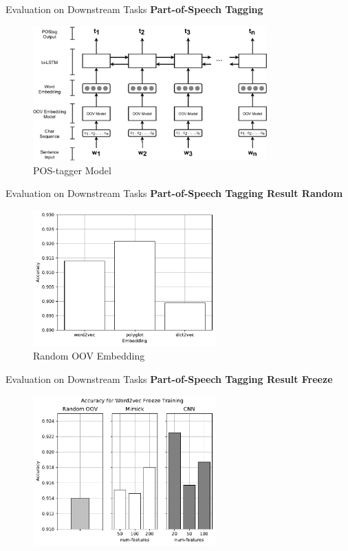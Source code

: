 \documentclass{beamer}
\begin{document}
\begin{frame}{Evaluation on Downstream Tasks}
    \textbf{Part-of-Speech Tagging}
    \begin{figure}[H]
        \centering
        \includegraphics[width=90mm]{images/postag}
        \caption{POS-tagger Model}
    \end{figure}
\end{frame}
\begin{frame}{Evaluation on Downstream Tasks}
    \textbf{Part-of-Speech Tagging Result Random}
    \begin{figure}[H]
        \centering
        \includegraphics[width=70mm]{images/random_graph}
        \caption{Random OOV Embedding}
    \end{figure}
\end{frame}
\begin{frame}{Evaluation on Downstream Tasks}
    \textbf{Part-of-Speech Tagging Result Freeze}
    \begin{figure}[H]
        \centering
        \includegraphics[width=70mm]{images/freeze_word2vec}
    \end{figure}
\end{frame}
\end{document}
